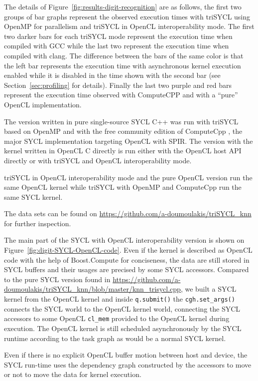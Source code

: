 \documentclass[sigplan, review, authordraft]{acmart}
\begin{document}
The details of Figure~\ref{fig:results-digit-recognition} are as follows,
the first two groups of bar graphs represent the observed execution times
with triSYCL using OpenMP for parallelism and triSYCL in OpenCL interoperability
mode. The first two darker bars for each triSYCL mode represent the execution
time when compiled with GCC while the last two represent the execution time when
compiled with clang. The difference between the bars of the same color is that
the left bar represents the execution time with asynchronous kernel execution
enabled while it is disabled in the time shown with the second bar (see
Section~\ref{sec:profiling} for details).
Finally the last two purple and red bars represent the execution time observed
with ComputeCPP and with a ``pure'' OpenCL implementation.


The version written in pure single-source SYCL C++ was run with
triSYCL based on OpenMP and with the free community edition of
ComputeCpp \cite{ComputeCpp}, the major SYCL implementation
\cite{ComputeCpp} targeting OpenCL with SPIR. The version with the
kernel written in OpenCL C directly is run either with the OpenCL host
API directly or with triSYCL and OpenCL interoperability mode.

triSYCL in OpenCL interoperability mode and the pure OpenCL version run
the same OpenCL kernel while triSYCL with OpenMP and ComputeCpp run the
same SYCL kernel.

The data sets can be found on
\url{https://github.com/a-doumoulakis/triSYCL_knn} for further
inspection.

The main part of the SYCL with OpenCL interoperability version is
shown on Figure~\ref{fig:digit-SYCL-OpenCL-code}. Even if the kernel is
described as OpenCL code with the help of Boost.Compute
\cite{Boost.Compute} for conciseness, the data are still stored in
SYCL buffers and their usages are precised by some SYCL
accessors. Compared to the pure SYCL version found in
\url{https://github.com/a-doumoulakis/triSYCL_knn/blob/master/knn_trisycl.cpp},
we built a SYCL kernel from the OpenCL kernel and inside
\lstinline|q.submit()| the \lstinline|cgh.set_args()| connects the
SYCL world to the OpenCL kernel world, connecting the SYCL accessors
to some OpenCL \lstinline|cl_mem| provided to the OpenCL kernel during
execution. The OpenCL kernel is still scheduled asynchronously by the
SYCL runtime according to the task graph as would be a normal SYCL
kernel.

Even if there is no explicit OpenCL buffer motion between host and
device, the SYCL run-time uses the dependency graph constructed by the
accessors to move or not to move the data for kernel execution.
\end{document}
